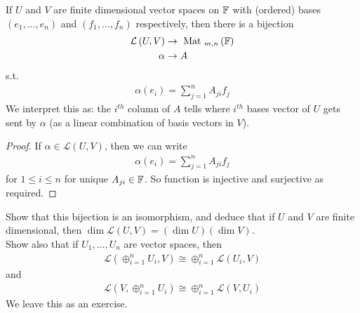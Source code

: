 \documentclass[a4paper]{article}
\begin{document}
\begin{coro}
If $U$ and $V$ are finite dimensional vector spaces on $\mathbb{F}$ with (ordered) bases $\left(e_1,...,e_n\right)$ and $\left(f_1,...,f_n\right)$ respectively, then there is a bijection
\begin{equation*}
\begin{aligned}
\mathcal{L} \left(U,V\right) &\to \text{ Mat }_{m,n} \left(\mathbb{F}\right)\\
\alpha &\to A
\end{aligned}
\end{equation*}
s.t.
\begin{equation*}
\begin{aligned}
\alpha\left(e_i\right) = \sum_{j=1}^n A_{ji} f_j
\end{aligned}
\end{equation*}
We interpret this as: the $i^{th}$ column of $A$ tells where $i^{th}$ bases vector of $U$ gets sent by $\alpha$ (as a linear combination of basis vectors in $V$).
\begin{proof}
If $\alpha\in \mathcal{L}\left(U,V\right)$, then we can write
\begin{equation*}
\begin{aligned}
\alpha\left(e_i\right) = \sum_{j=1}^n A_{ji} f_j
\end{aligned}
\end{equation*}
for $1 \leq i \leq n$ for unique $A_{ji} \in \mathbb{F}$. So function is injective and surjective as required.
\end{proof}
\end{coro}

\begin{prop}
Show that this bijection is an isomorphism, and deduce that if $U$ and $V$ are finite dimensional, then $\dim \mathcal{L}\left(U,V\right) = \left(\dim U\right)\left(\dim V\right)$.\\
Show also that if $U_1,...,U_n$ are vector spaces, then
\begin{equation*}
\begin{aligned}
\mathcal{L}\left(\oplus_{i=1}^n U_i,V\right) \cong \oplus_{i=1}^n \mathcal{L}\left(U_i,V\right)
\end{aligned}
\end{equation*}
and
\begin{equation*}
\begin{aligned}
\mathcal{L}\left(V,\oplus_{i=1}^n U_i\right) \cong \oplus_{i=1}^n \mathcal{L}\left(V,U_i\right)
\end{aligned}
\end{equation*}
We leave this as an exercise.
\end{prop}
\end{document}
